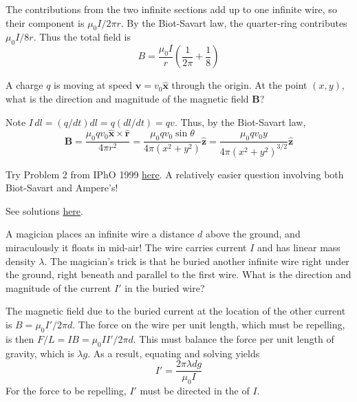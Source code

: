 \documentclass[11pt]{scrartcl}
\begin{document}
\begin{sol}
    The contributions from the two infinite sections add up to one infinite wire, so their component is $\mu_0I/2\pi r$. By the Biot-Savart law, the quarter-ring contributes $\mu_0I/8r$. Thus the total field is $$B=\boxed{\frac{\mu_0I}{r}\left(\frac{1}{2\pi}+\frac18\right)}$$
\end{sol}

\begin{prob}
    A charge $q$ is moving at speed $\mathbf v=v_0\hat{\mathbf x}$ through the origin. At the point $(x,y)$, what is the direction and magnitude of the magnetic field $\mathbf B$?
\end{prob}

\begin{sol}
    Note $I\, dl=(q/dt)dl=q(dl/dt)=qv.$ Thus, by the Biot-Savart law, $$\mathbf B=\frac{\mu_0q v_0\hat{\mathbf x}\times \hat{\mathbf r}}{4\pi r^2}=\frac{\mu_0q v_0\sin\theta}{4\pi (x^2+y^2)}\hat{\mathbf z}=\boxed{\frac{\mu_0q v_0y}{4\pi (x^2+y^2)^{3/2}}\hat{\mathbf z}}$$
\end{sol}

\begin{prob}[IPhO]
    Try Problem 2 from IPhO 1999 \href{https://s3.eu-central-1.amazonaws.com/physprob.com/files/ipho/1999_Italy_p2.pdf}{here}. A relatively easier question involving both Biot-Savart and Ampere's!
\end{prob}

\begin{sol}
    See solutions \href{https://s3.eu-central-1.amazonaws.com/physprob.com/files/ipho/1999_Italy_p2Sol.pdf}{here}.
\end{sol}

\begin{prob}
    A magician places an infinite wire a distance $d$ above the ground, and miraculously it floats in mid-air! The wire carries current $I$ and has linear mass density $\lambda$. The magician's trick is that he buried another infinite wire right under the ground, right beneath and parallel to the first wire. What is the direction and magnitude of the current $I'$ in the buried wire?
\end{prob}

\begin{sol}
    The magnetic field due to the buried current at the location of the other current is $B=\mu_0I'/2\pi d$. The force on the wire per unit length, which must be repelling, is then $F/L=IB=\mu_0II'/2\pi d$. This must balance the force per unit length of gravity, which is $\lambda g$. As a result, equating and solving yields $$I'=\boxed{\frac{2\pi\lambda dg}{\mu_0I}}$$For the force to be repelling, $I'$ must be directed in the  of $I.$
\end{sol}
\end{document}
